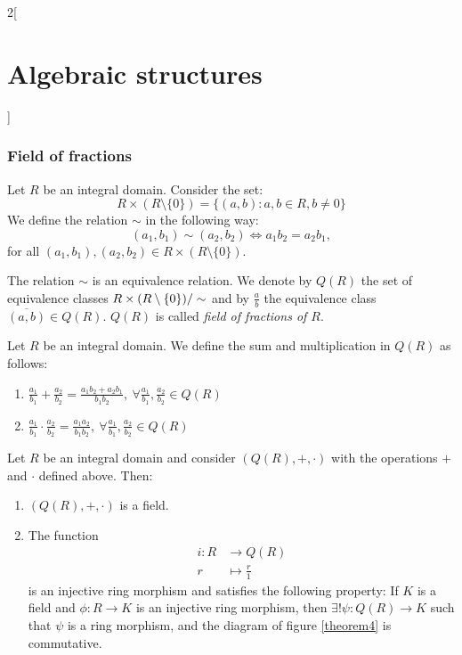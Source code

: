 \documentclass[../../../main.tex]{subfiles}
\begin{document}
\begin{multicols}{2}[\section{Algebraic structures}]
  \subsubsection{Field of fractions}
  \begin{definition}
    Let $R$ be an integral domain. Consider the set: $$R\times(R\setminus\{0\})=\{(a,b):a,b\in R,b\ne 0\}$$ We define the relation $\sim$ in the following way: $$(a_1,b_1)\sim(a_2,b_2)\iff a_1b_2=a_2b_1,$$ for all $(a_1,b_1),(a_2,b_2)\in R\times(R\setminus\{0\})$.
  \end{definition}
  \begin{lemma}
    The relation $\sim$ is an equivalence relation. We denote by $Q(R)$ the set of equivalence classes $\quot{R\times(R\setminus\{0\})}{\sim}$ and by $\frac{a}{b}$ the equivalence class $\overline{(a,b)}\in Q(R)$. $Q(R)$ is called \textit{field of fractions of $R$}.
  \end{lemma}
  \begin{definition}
    Let $R$ be an integral domain. We define the sum and multiplication in $Q(R)$ as follows:
    \begin{enumerate}
      \item $\displaystyle\frac{a_1}{b_1}+\frac{a_2}{b_2}=\frac{a_1b_2+a_2b_1}{b_1b_2},\ \forall\frac{a_1}{b_1},\frac{a_2}{b_2}\in Q(R)$
      \item $\displaystyle\frac{a_1}{b_1}\cdot\frac{a_2}{b_2}=\frac{a_1a_2}{b_1b_2},\ \forall\frac{a_1}{b_1},\frac{a_2}{b_2}\in Q(R)$
    \end{enumerate}
  \end{definition}
  \begin{theorem}
    Let $R$ be an integral domain and consider $(Q(R),+,\cdot)$ with the operations $+$ and $\cdot$ defined above. Then:
    \begin{enumerate}
      \item $(Q(R),+,\cdot)$ is a field.
      \item The function
            \begin{align*}
              i:R & \longrightarrow Q(R)    \\
              r   & \longmapsto \frac{r}{1}
            \end{align*}
            is an injective ring morphism and satisfies the following property: If $K$ is a field and $\phi:R\rightarrow K$ is an injective ring morphism, then $\exists!\psi:Q(R)\rightarrow K$ such that $\psi$ is a ring morphism, and the diagram of figure \ref{theorem4} is commutative.
    \end{enumerate}
    \begin{center}
      \begin{minipage}{\linewidth}
        \centering
        
        \label{theorem4}
      \end{minipage}
    \end{center}
  \end{theorem}

\end{multicols}
\end{document}

